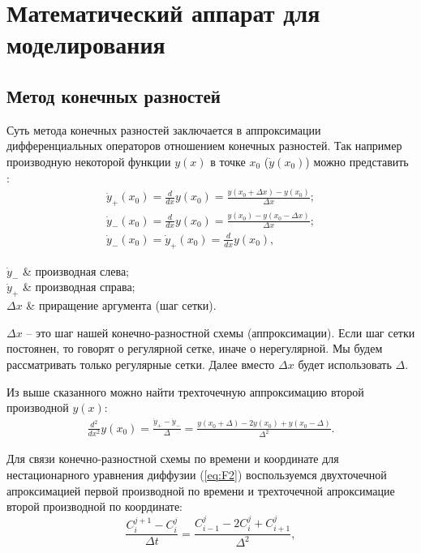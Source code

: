 \chapter{Математический аппарат для моделирования}

\section{Метод конечных разностей}
Суть метода конечных разностей заключается в аппроксимации дифференциальных операторов отношением конечных разностей. Так например производную некоторой функции $y(x)$ в точке $x_{0}$ ($\dot{y}(x_{0})$) можно представить \cite{Samarski}:
\begin{gather}
	\dot{y}_{+}(x_{0}) = \frac{d}{dx}y(x_{0}) = \frac{y(x_{0} + \Delta x) - y(x_{0})}{\Delta x };\\
	\dot{y}_{-}(x_{0}) = \frac{d}{dx}y(x_{0}) = \frac{ y(x_{0}) - y(x_{0} - \Delta x)}{\Delta x };\\
	\dot{y}_{-}(x_{0}) = \dot{y}_{+}(x_{0}) = \frac{d}{dx}y(x_{0}),
\end{gather}
\begin{conditions}
	$\dot{y}_{-}$ & производная слева;\\
	$\dot{y}_{+}$ & производная справа;\\
	$\Delta x$ & приращение аргумента (шаг сетки).
\end{conditions}

$\Delta x$ -- это шаг нашей конечно-разностной схемы (аппроксимации). Если шаг сетки постоянен, то говорят о регулярной сетке, иначе о нерегулярной. Мы будем рассматривать только регулярные сетки. Далее вместо $\Delta x$ будет использовать $\Delta$.

Из выше сказанного можно найти трехточечную аппроксимацию второй производной $y(x)$:
\begin{gather}
	\frac{d^{2}}{dx^{2}}y(x_{0}) = \frac{\dot{y}_{+} - \dot{y}_{-}}{\Delta} = \frac{y(x_{0} + \Delta) - 2y(x_{0}) + y(x_{0} - \Delta)}{ \Delta^{2}}.
\end{gather}

Для связи конечно-разностной схемы по времени и координате для нестационарного уравнения диффузии (\ref{eq:F2}) воспользуемся двухточечной апроксимацией первой производной по времени и трехточечной апроксимацие второй производной по координате: 
\begin{equation}
	\label{eq:xt}
	\frac{C^{j+1}_{i} - C^{j}_{i}}{\Delta t} = \frac{C^{j}_{i-1} - 2C^{j}_{i} + C^{j}_{i+1}}{\Delta^{2}},
\end{equation}

